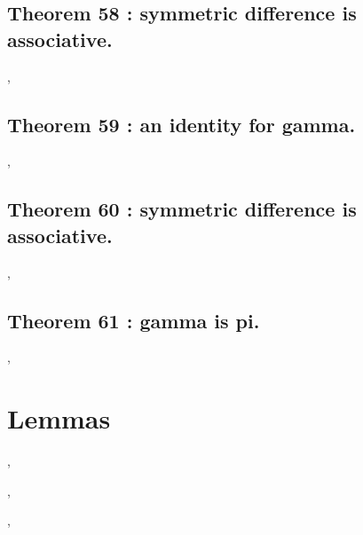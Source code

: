 \documentclass[preview]{standalone}
\begin{document}
\subsection[Symmetric difference is associative.]
    {
        \color{section}Theorem 58 \color{black} : symmetric difference is associative.
    }

\sep
\pagebreak


\subsection[An identity for gamma.]
    {
        \color{section}Theorem 59 \color{black} : an identity for gamma.
    }

\sep
\pagebreak


\subsection[Symmetric difference is associative.]
    {
        \color{section}Theorem 60 \color{black} : symmetric difference is associative.
    }

\sep
\pagebreak

\subsection[Gamma is pi.]
    {
        \color{section}Theorem 61 \color{black} : gamma is pi.
    }

\sep
\pagebreak


\section{Lemmas}
\sep



\sep



\sep
\pagebreak
\end{document}
